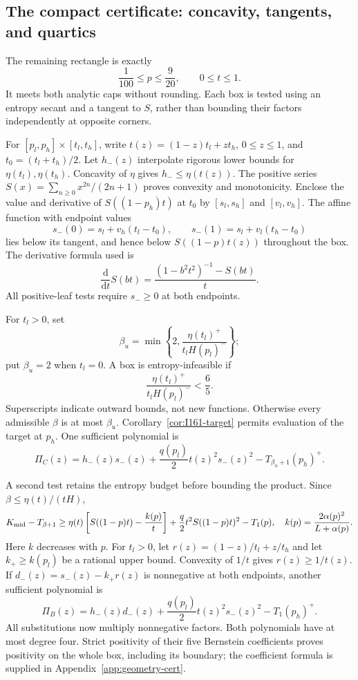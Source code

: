 \documentclass[11pt]{article}
\theoremstyle{remark}\newtheorem{remark}[theorem]{Remark}
\numberwithin{equation}{section}
\begin{document}
\subsection{The compact certificate: concavity, tangents, and quartics}\label{sec:compact}
The remaining rectangle is exactly
\begin{equation}\label{eq:I16-rectangle}
 \frac1{100}\le p\le\frac9{20},\qquad 0\le t\le1.
\end{equation}
It meets both analytic caps without rounding. Each box is tested using an
entropy secant and a tangent to $S$, rather than bounding their factors
independently at opposite corners.

For $[p_l,p_h]\times[t_l,t_h]$, write $t(z)=(1-z)t_l+zt_h$, $0\le z\le1$,
and $t_0=(t_l+t_h)/2$. Let $h_-(z)$ interpolate rigorous lower bounds for
$\eta(t_l),\eta(t_h)$. Concavity of $\eta$ gives $h_-\le\eta(t(z))$.
The positive series $S(x)=\sum_{n\ge0}x^{2n}/(2n+1)$ proves convexity and
monotonicity. Enclose the value and derivative of $S((1-p_h)t)$ at $t_0$
by $[s_l,s_h]$ and $[v_l,v_h]$. The affine function with endpoint values
\[
 s_-(0)=s_l+v_h(t_l-t_0),\qquad
 s_-(1)=s_l+v_l(t_h-t_0)
\]
lies below its tangent, and hence below $S((1-p)t(z))$ throughout the box.
The derivative formula used is
\[
 \frac{\mathrm d}{\mathrm dt}S(bt)
 =\frac{(1-b^2t^2)^{-1}-S(bt)}t.
\]
All positive-leaf tests require $s_-\ge0$ at both endpoints.

For $t_l>0$, set
\[
 \beta_u=\min\left\{2,\frac{\eta(t_l)^+}{t_lH(p_l)^-}\right\};
\]
put $\beta_u=2$ when $t_l=0$. A box is entropy-infeasible if
\begin{equation}\label{eq:I16-empty-test}
 \frac{\eta(t_l)^+}{t_lH(p_l)^-}<\frac65.
\end{equation}
Superscripts indicate outward bounds, not new functions.
Otherwise every admissible $\beta$ is at most $\beta_u$.
Corollary~\ref{cor:I161-target} permits evaluation of the target at $p_h$.
One sufficient polynomial is
\begin{equation}\label{eq:I16-box-test}
 \Pi_C(z)=h_-(z)s_-(z)+\frac{q(p_l)}2t(z)^2s_-(z)^2
             -T_{\beta_u+1}(p_h)^+.
\end{equation}

A second test retains the entropy budget before bounding the product.
Since $\beta\le\eta(t)/(tH)$,
\[
 K_{\rm mid}-T_{\beta+1}
 \ge\eta(t)\left[S((1-p)t)-\frac{k(p)}t\right]
       +\frac q2t^2S((1-p)t)^2-T_1(p),
 \quad k(p)=\frac{2\alpha(p)^2}{L+\alpha(p)}.
\]
Here $k$ decreases with $p$. For $t_l>0$, let
$r(z)=(1-z)/t_l+z/t_h$ and let $k_+\ge k(p_l)$ be a rational upper bound.
Convexity of $1/t$ gives $r(z)\ge1/t(z)$. If
$d_-(z)=s_-(z)-k_+r(z)$ is nonnegative at both endpoints, another sufficient
polynomial is
\[
 \Pi_B(z)=h_-(z)d_-(z)+\frac{q(p_l)}2t(z)^2s_-(z)^2-T_1(p_h)^+.
\]
All substitutions now multiply nonnegative factors. Both polynomials have
at most degree four. Strict positivity of their five Bernstein coefficients
proves positivity on the whole box, including its boundary; the coefficient
formula is supplied in Appendix~\ref{app:geometry-cert}.
\end{document}
